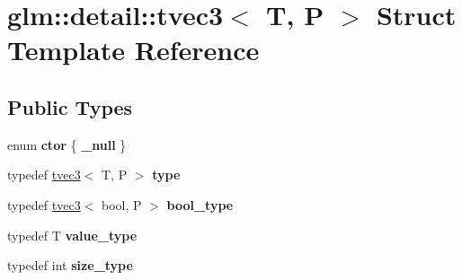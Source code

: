 \hypertarget{structglm_1_1detail_1_1tvec3}{\section{glm\-:\-:detail\-:\-:tvec3$<$ T, P $>$ Struct Template Reference}
\label{structglm_1_1detail_1_1tvec3}
}
\subsection*{Public Types}
\begin{DoxyCompactItemize}
\item 
enum {\bfseries ctor} \{ {\bfseries \-\_\-null}
 \}
\item 
\hypertarget{structglm_1_1detail_1_1tvec3_acd2bae8742f34efdb3605e8399b5e7c1}{typedef \hyperlink{structglm_1_1detail_1_1tvec3}{tvec3}$<$ T, P $>$ {\bfseries type}}\label{structglm_1_1detail_1_1tvec3_acd2bae8742f34efdb3605e8399b5e7c1}

\item 
\hypertarget{structglm_1_1detail_1_1tvec3_aabd96f8052cc3964f695e9307a4ad403}{typedef \hyperlink{structglm_1_1detail_1_1tvec3}{tvec3}$<$ bool, P $>$ {\bfseries bool\-\_\-type}}\label{structglm_1_1detail_1_1tvec3_aabd96f8052cc3964f695e9307a4ad403}

\item 
\hypertarget{structglm_1_1detail_1_1tvec3_aebabd0d52c43d26ee4d66ba4606eb03c}{typedef T {\bfseries value\-\_\-type}}\label{structglm_1_1detail_1_1tvec3_aebabd0d52c43d26ee4d66ba4606eb03c}

\item 
\hypertarget{structglm_1_1detail_1_1tvec3_a9c82390594a6adc72db5533c2f1013a4}{typedef int {\bfseries size\-\_\-type}}\label{structglm_1_1detail_1_1tvec3_a9c82390594a6adc72db5533c2f1013a4}

\end{DoxyCompactItemize}
